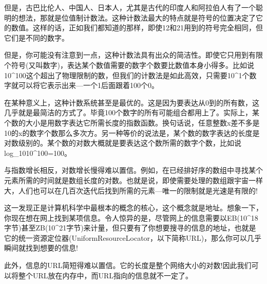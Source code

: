 但是，古巴比伦人、中国人、日本人，尤其是古代的印度人和阿拉伯人有了一个聪明的想法，那就是位值制计数法。这种计数法最大的特点就是符号的位置决定了它的数值。这样的话，正如我们都知道的那样，即使12和21用到的符号完全相同，但它们是不同的数字。

但是，你可能没有注意到一点，这种计数法具有出众的简洁性。即使它只用到有限个符号(又叫数字)，表达某个数值需要的数字个数要比数值本身小得多。比如说10^100这个超出了物理限制的数，但我们的计数法是如此高效，只需要10^1个数字就可以将它表示出来---一个1后面跟着100个0。

在某种意义上，这种计数系统甚至是最优的。这是因为要表达从0到的所有数，这几乎就是最简洁的方式了。毕竟100个数字的所有可能组合都用上了。实际上，某个数的大小是用数字表达它所需长度的指数函数。换句话说，任意整数x差不多是10的x的数字个数那么多次方。另一种等价的说法是，某个数的数字表达的长度是对数级别的。某个数的对数大概就是要表达这个数所需的数字个数，比如说log_1010^100=100。

与指数增长相反，对数增长慢得难以置信。例如，在已经排好序的数组中寻找某个元素所需的时间就是数组长度的对数。也就是说，即使需要处理的数组跟宇宙一样大，人们也可以在几百次迭代后找到所需的元素---唯一的限制就是光速是有限的!

这一发现正是计算机科学中最根本的概念的核心，这个概念就是地址。想象一下，你现在想在网上找到某项信息。令人惊异的是，尽管网上的信息需要以EB(10^18字节)甚至ZB(10^21字节)来计量，但只要有了你想要搜寻的信息的地址，也就是它的统一资源定位器(UniformResourceLocator，以下简称URL)，那么你可以几乎瞬间就找到想要的信息!

此外，信息的URL简短得难以置信。它的长度是整个网络大小的对数!因此我们可以将整个URL放在内存中，而URL指向的信息就不一定了。


